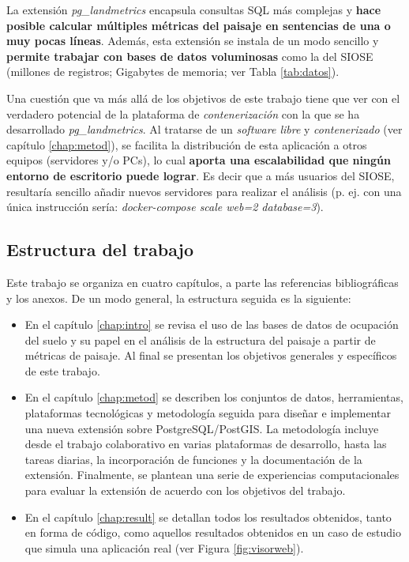 \begin{prologo}
La extensión \textit{pg\_landmetrics} encapsula consultas SQL más complejas y \textbf{hace posible calcular múltiples métricas del paisaje en sentencias de una o muy pocas líneas}. Además, esta extensión se instala de un modo sencillo y \textbf{permite trabajar con bases de datos voluminosas} como la del SIOSE (millones de registros; Gigabytes de memoria; ver Tabla \ref{tab:datos}). 

Una cuestión que va más allá de los objetivos de este trabajo tiene que ver con el verdadero potencial de la plataforma de \textit{contenerización} con la que se ha desarrollado \textit{pg\_landmetrics}. Al tratarse de un \textit{software libre} y \textit{contenerizado} (ver capítulo \ref{chap:metod}), se facilita la distribución de esta aplicación a otros equipos (servidores y/o PCs), lo cual \textbf{aporta una escalabilidad que ningún entorno de escritorio puede lograr}. Es decir que a más usuarios del SIOSE, resultaría sencillo añadir nuevos servidores para realizar el análisis (p. ej. con una única instrucción sería: \textit{docker-compose scale web=2 database=3}).

\subsection*{Estructura del trabajo}
Este trabajo se organiza en cuatro capítulos, a parte las referencias bibliográficas y los anexos. De un modo general, la estructura seguida es la siguiente:
\begin{itemize}
\item En el capítulo \ref{chap:intro} se revisa el uso de las bases de datos de ocupación del suelo y su papel en el análisis de la estructura del paisaje a partir de métricas de paisaje. Al final se presentan los objetivos generales y específicos de este trabajo.

\item En el capítulo \ref{chap:metod} se describen los conjuntos de datos, herramientas, plataformas tecnológicas y metodología seguida para diseñar e implementar una nueva extensión sobre PostgreSQL/PostGIS. La metodología incluye desde el trabajo colaborativo en varias plataformas de desarrollo, hasta las tareas diarias, la incorporación de funciones y la documentación de la extensión. Finalmente, se plantean una serie de experiencias computacionales para evaluar la extensión de acuerdo con los objetivos del trabajo.

\item En el capítulo \ref{chap:result} se detallan todos los resultados obtenidos, tanto en forma de código, como aquellos resultados obtenidos en un caso de estudio que simula una aplicación real (ver Figura \ref{fig:visorweb}).


\end{itemize}
\end{prologo}
